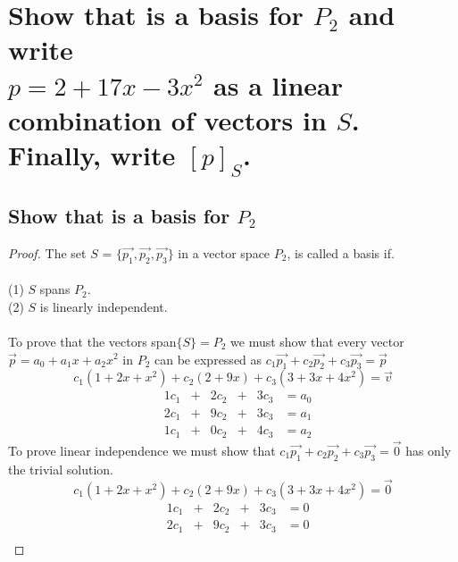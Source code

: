\documentclass[../main.tex]{subfiles}
\begin{document}
\section{Show that  is a basis for $P_2$ and write \\
  $p = 2 + 17x - 3x^2$ as a linear combination of vectors in $S$. Finally, write $[p]_S$.}
\subsection{Show that  is a basis for $P_2$}
\begin{proof}
  The set $S$ = $\{\vec{p_{1}}, \vec{p_{2}}, \vec{p_{3}}\}$ in a vector space $P_2$, is called a basis if. \\\\
  (1) $S$ spans $P_2$.\\
  (2) $S$ is linearly independent.\\\\
  To prove that the vectors span$\{S\}=P_2$ we must show that
  every vector $\vec{p} = a_{0} + a_{1}x + a_{2}x^{2}$ in $P_2$
  can be expressed as $c_{1}\vec{p_{1}} + c_{2}\vec{p_{2}} + c_{3}\vec{p_{3}} = \vec{p}$\\
  \begin{equation}
    c_{1}(1+2x+x^2) + c_{2}(2 + 9x) + c_{3}(3 + 3x + 4x^2) = \vec{v}
  \end{equation}
  $$
    \begin{matrix}
       & 1c_{1} & + & 2c_{2} & + & 3c_{3} & = a_{0} \\
       & 2c_{1} & + & 9c_{2} & + & 3c_{3} & = a_{1} \\
       & 1c_{1} & + & 0c_{2} & + & 4c_{3} & = a_{2}
    \end{matrix}
  $$
  To prove linear independence we must show that $c_{1}\vec{p_{1}} + c_{2}\vec{p_{2}} + c_{3}\vec{p_{3}} = \vec{0}$
  has only the trivial solution.\\
  \begin{equation}
    c_{1}(1+2x+x^2) + c_{2}(2 + 9x) + c_{3}(3 + 3x + 4x^2) = \vec{0}
  \end{equation}
  $$
    \begin{matrix}
       & 1c_{1} & + & 2c_{2} & + & 3c_{3} & = 0 \\
       & 2c_{1} & + & 9c_{2} & + & 3c_{3} & = 0 \\

\end{matrix}$$
\end{proof}
\end{document}
